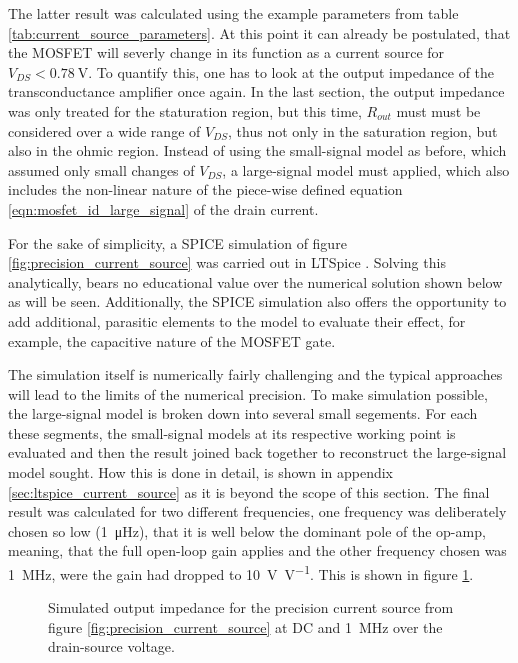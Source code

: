The latter result was calculated using the example parameters from table \ref{tab:current_source_parameters}. At this point it can already be postulated, that the MOSFET will severly change in its function as a current source for $V_{DS} < \qty{0.78}{\V}$. To quantify this, one has to look at the output impedance of the transconductance amplifier once again. In the last section, the output impedance was only treated for the staturation region, but this time, $R_{out}$ must must be considered over a wide range of $V_{DS}$, thus not only in the saturation region, but also in the ohmic region. Instead of using the small-signal model as before, which assumed only small changes of $V_{DS}$, a large-signal model must applied, which also includes the non-linear nature of the piece-wise defined equation \ref{eqn:mosfet_id_large_signal} of the drain current.

For the sake of simplicity, a SPICE simulation of figure \ref{fig:precision_current_source} was carried out in LTSpice \cite{ltspice}. Solving this analytically, bears no educational value over the numerical solution shown below as will be seen. Additionally, the SPICE simulation also offers the opportunity to add additional, parasitic elements to the model to evaluate their effect, for example, the capacitive nature of the MOSFET gate.

The simulation itself is numerically fairly challenging and the typical approaches will lead to the limits of the numerical precision. To make simulation possible, the large-signal model is broken down into several small segements. For each these segments, the small-signal models at its respective working point is evaluated and then the result joined back together to reconstruct the large-signal model sought. How this is done in detail, is shown in appendix \ref{sec:ltspice_current_source} as it is beyond the scope of this section. The final result was calculated for two different frequencies, one frequency was deliberately chosen so low (\qty{1}{\micro\Hz}), that it is well below the dominant pole of the op-amp, meaning, that the full open-loop gain applies and the other frequency chosen was \qty{1}{\MHz}, were the gain had dropped to \qty[per-mode=power]{10}{\V \per V}. This is shown in figure \ref{fig:ltspice_output_impedance_simulation}.

\begin{figure}[ht]
    \centering
    
    \caption{Simulated output impedance for the precision current source from figure \ref{fig:precision_current_source} at DC and \qty{1}{\MHz} over the drain-source voltage.}
    \label{fig:ltspice_output_impedance_simulation}
\end{figure}


